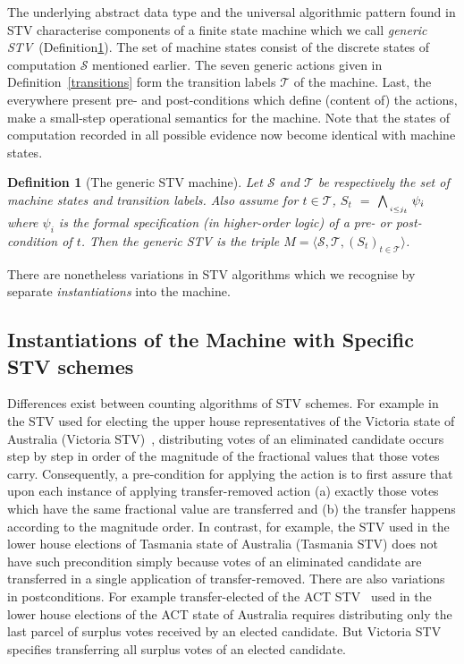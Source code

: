 \documentclass[10pt,conference]{IEEEtran}
\newtheorem{definition}{Definition}
\begin{document}
The underlying abstract data type and the universal algorithmic pattern found in STV characterise components of a finite state machine which we call \emph{generic STV}~(Definition\ref{STVMachine}). The set of machine states consist of the discrete states of computation $\mathcal{S}$ mentioned earlier. The seven generic actions given in Definition~\ref{transitions} form the transition labels $\mathcal{T}$ of the machine. Last, the everywhere present pre- and post-conditions which define (content of)  the actions, make a small-step operational semantics for the machine.  
Note that the states of computation recorded in all possible  evidence now become identical with machine states.


\begin{definition}[The generic STV machine]\label{STVMachine}
Let $\mathcal{S}$  and $\mathcal{T}$
be respectively the set of machine states and transition labels.  Also assume for $t\in\mathcal{T}$, $S_{t}$ $=$ $\bigwedge_{\atop{i\leq j_{t}}} \psi_{i}$ 
 where $\psi_{i}$ is the formal specification (in higher-order logic) of a pre- or post-condition of $t$. Then the \emph{generic STV} is the triple $M = \langle \mathcal{S}, \mathcal{T}, (S_t)_{t \in \mathcal{T}} \rangle$.  
\end{definition}
There are nonetheless variations in STV algorithms  which we  recognise  by separate \emph{instantiations} into the machine.  
\subsection{Instantiations of the Machine with Specific STV schemes}
Differences exist between counting algorithms of STV schemes.  For example in the STV used for electing the upper house representatives of the Victoria state of Australia (Victoria STV)~\cite{vic}, distributing votes of an eliminated candidate occurs step by step in order of the magnitude of the fractional values that those votes carry.  Consequently, a pre-condition for applying the action is to first assure that upon each instance of applying transfer-removed action (a) exactly those votes which have the same fractional value are transferred and (b) the transfer happens according to the magnitude order. In contrast, for example, the STV used in the lower house elections of Tasmania state of Australia (Tasmania STV) does not have such precondition simply because votes of an eliminated candidate are transferred in a single application of transfer-removed. There are also variations in postconditions. For example transfer-elected of the ACT STV~\cite{act} used in the lower house elections of the ACT state of Australia requires distributing only the last parcel of surplus votes received by an elected candidate. But Victoria STV specifies transferring all surplus votes of an elected candidate.  
\end{document}
